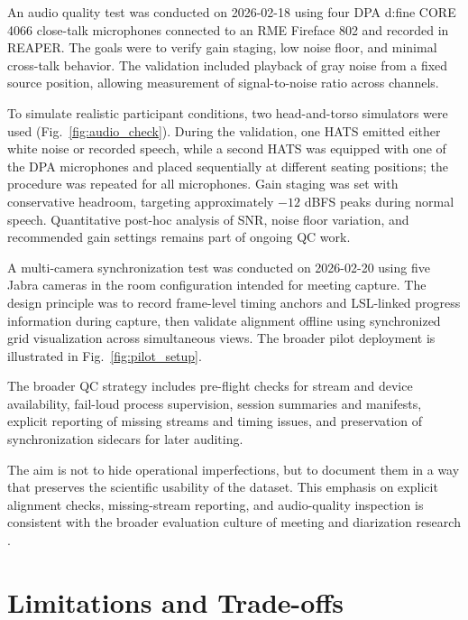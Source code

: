 \documentclass[runningheads]{llncs}
\begin{document}

\noindent An audio quality test was conducted on 2026-02-18 using four DPA d:fine CORE 4066 close-talk microphones connected to an RME Fireface 802 and recorded in REAPER. The goals were to verify gain staging, low noise floor, and minimal cross-talk behavior. The validation included playback of gray noise from a fixed source position, allowing measurement of signal-to-noise ratio across channels.

To simulate realistic participant conditions, two head-and-torso simulators were used (Fig.~\ref{fig:audio_check}). During the validation, one HATS emitted either white noise or recorded speech, while a second HATS was equipped with one of the DPA microphones and placed sequentially at different seating positions; the procedure was repeated for all microphones. Gain staging was set with conservative headroom, targeting approximately \(-12\) dBFS peaks during normal speech. Quantitative post-hoc analysis of SNR, noise floor variation, and recommended gain settings remains part of ongoing QC work.


\noindent A multi-camera synchronization test was conducted on 2026-02-20 using five Jabra cameras in the room configuration intended for meeting capture. The design principle was to record frame-level timing anchors and LSL-linked progress information during capture, then validate alignment offline using synchronized grid visualization across simultaneous views. The broader pilot deployment is illustrated in Fig.~\ref{fig:pilot_setup}.

 
\noindent The broader QC strategy includes pre-flight checks for stream and device availability, fail-loud process supervision, session summaries and manifests, explicit reporting of missing streams and timing issues, and preservation of synchronization sidecars for later auditing.

The aim is not to hide operational imperfections, but to document them in a way that preserves the scientific usability of the dataset. This emphasis on explicit alignment checks, missing-stream reporting, and audio-quality inspection is consistent with the broader evaluation culture of meeting and diarization research \cite{anguera2012_diarization_review}.

\section{Limitations and Trade-offs}
\end{document}
